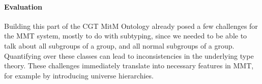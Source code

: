 \paragraph{Evaluation}
Building this part of the CGT MitM Ontology already posed a few challenges for
the MMT system, mostly to do with subtyping, since we needed to be able to talk
about all subgroups of a group, and all normal subgroups of a group. Quantifying
over these classes can lead to inconsistencies in the underlying type theory.
These challenges immediately translate into necessary
features in MMT, for example by introducing universe hierarchies.


